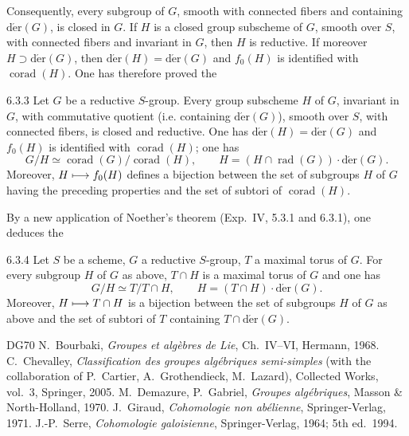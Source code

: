Consequently, every subgroup of $G$, smooth with connected fibers and containing $\operatorname{d\acute er}(G)$, is closed in $G$.{\renewcommand{\thefootnote}{(64)}\footnotemark[65]}
\label{XXII.6.3.2}
If $H$ is a closed group subscheme of $G$, smooth over $S$, with connected fibers and invariant in $G$, then $H$ is reductive. If moreover $H\supset\operatorname{d\acute er}(G)$, then $\operatorname{d\acute er}(H)=\operatorname{d\acute er}(G)$ and $f_0(H)$ is identified with $\operatorname{corad}(H)$. One has therefore proved the
\begin{proposition}{6.3.3}\label{XXII.6.3.3}
Let $G$ be a reductive $S$-group. Every group subscheme $H$ of $G$, invariant in $G$, with commutative quotient (i.e. containing $\operatorname{d\acute er}(G)$), smooth over $S$, with connected fibers,{\renewcommand{\thefootnote}{(65)}} is closed and reductive. One has $\operatorname{d\acute er}(H)=\operatorname{d\acute er}(G)$ and $f_0(H)$ is identified with $\operatorname{corad}(H)$; one has
\[
G/H\simeq\operatorname{corad}(G)/\operatorname{corad}(H),\qquad H=(H\cap\operatorname{rad}(G))\cdot\operatorname{d\acute er}(G).
\]
Moreover, $H\longmapsto f_0(H)$ defines a bijection between the set of subgroups $H$ of $G$ having the preceding properties and the set of subtori of $\operatorname{corad}(H)$.
\end{proposition}
By a new application of Noether's theorem (Exp.~IV, 5.3.1 and 6.3.1), one deduces the
\begin{proposition}{6.3.4}\label{XXII.6.3.4}
Let $S$ be a scheme, $G$ a reductive $S$-group, $T$ a maximal torus of $G$. For every subgroup $H$ of $G$ as above, $T\cap H$ is a maximal torus of $G$ and one has
\[
G/H\simeq T/T\cap H,\qquad H=(T\cap H)\cdot\operatorname{d\acute er}(G).
\]
Moreover, $H\longmapsto T\cap H$ is a bijection between the set of subgroups $H$ of $G$ as above and the set of subtori of $T$ containing $T\cap\operatorname{d\acute er}(G)$.
\end{proposition}

\begin{thebibliography}{DG70}
 N.~Bourbaki, \textit{Groupes et alg\`ebres de Lie}, Ch.~IV--VI, Hermann, 1968.
 C.~Chevalley, \textit{Classification des groupes alg\'ebriques semi-simples} (with the collaboration of P.~Cartier, A.~Grothendieck, M.~Lazard), Collected Works, vol.~3, Springer, 2005.
 M.~Demazure, P.~Gabriel, \textit{Groupes alg\'ebriques}, Masson \& North-Holland, 1970.
 J.~Giraud, \textit{Cohomologie non ab\'elienne}, Springer-Verlag, 1971.
 J.-P.~Serre, \textit{Cohomologie galoisienne}, Springer-Verlag, 1964; 5th ed.~1994.
\end{thebibliography}
